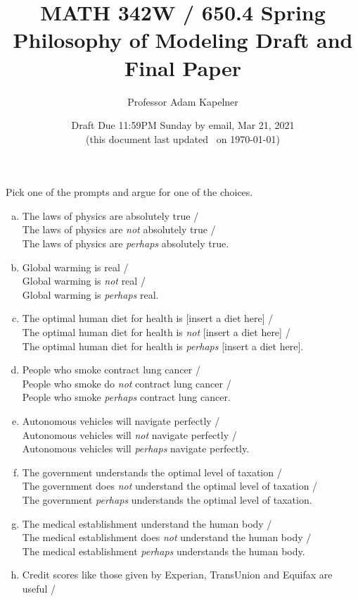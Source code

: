 \documentclass[12pt]{article}
\title{MATH 342W / 650.4 Spring \the\year \\ Philosophy of Modeling Draft and Final Paper}
\author{Professor Adam Kapelner} %
\date{Draft Due 11:59PM Sunday by email, Mar 21, 2021 \\ \vspace{0.5cm} \small (this document last updated \currenttime~on \today)}
\begin{document}
\maketitle

\noindent Pick one of the prompts and argue for one of the choices. 

\begin{enumerate}[(a)]
\item The laws of physics are absolutely true / \\
The laws of physics are \textit{not} absolutely true / \\
The laws of physics are \textit{perhaps} absolutely true.
\item Global warming is real / \\
Global warming is \textit{not} real / \\
Global warming is \textit{perhaps} real.
\item The optimal human diet for health is [insert a diet here] / \\
The optimal human diet for health is \textit{not} [insert a diet here] / \\
The optimal human diet for health is \textit{perhaps} [insert a diet here].
\item People who smoke contract lung cancer / \\
People who smoke do \textit{not} contract lung cancer / \\
People who smoke \textit{perhaps} contract lung cancer.
\item Autonomous vehicles will navigate perfectly / \\
Autonomous vehicles will \textit{not} navigate perfectly / \\
Autonomous vehicles will \textit{perhaps} navigate perfectly.
\item The government understands the optimal level of taxation / \\
The government does \textit{not} understand the optimal level of taxation / \\
The government \textit{perhaps} understands the optimal level of taxation.
\item The medical establishment understand the human body / \\
The medical establishment does \textit{not} understand the human body / \\
The medical establishment \textit{perhaps} understands the human body.
\item Credit scores like those given by Experian, TransUnion and Equifax are useful / \\

\end{enumerate}
\end{document}
